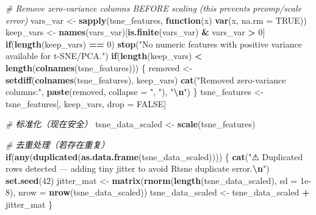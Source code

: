 \documentclass[
]{article}
\newenvironment{Shaded}{\begin{snugshade}}{\end{snugshade}}
\newcommand{\AttributeTok}[1]{\textcolor[rgb]{0.13,0.29,0.53}{#1}}
\newcommand{\CommentTok}[1]{\textcolor[rgb]{0.56,0.35,0.01}{\textit{#1}}}
\newcommand{\ConstantTok}[1]{\textcolor[rgb]{0.56,0.35,0.01}{#1}}
\newcommand{\ControlFlowTok}[1]{\textcolor[rgb]{0.13,0.29,0.53}{\textbf{#1}}}
\newcommand{\DecValTok}[1]{\textcolor[rgb]{0.00,0.00,0.81}{#1}}
\newcommand{\FloatTok}[1]{\textcolor[rgb]{0.00,0.00,0.81}{#1}}
\newcommand{\FunctionTok}[1]{\textcolor[rgb]{0.13,0.29,0.53}{\textbf{#1}}}
\newcommand{\NormalTok}[1]{#1}
\newcommand{\OtherTok}[1]{\textcolor[rgb]{0.56,0.35,0.01}{#1}}
\newcommand{\SpecialCharTok}[1]{\textcolor[rgb]{0.81,0.36,0.00}{\textbf{#1}}}
\newcommand{\StringTok}[1]{\textcolor[rgb]{0.31,0.60,0.02}{#1}}
\begin{document}
\begin{Shaded}
\begin{Highlighting}[]
\CommentTok{\# Remove zero{-}variance columns BEFORE scaling (this prevents prcomp/scale error)}
\NormalTok{vars\_var }\OtherTok{\textless{}{-}} \FunctionTok{sapply}\NormalTok{(tsne\_features, }\ControlFlowTok{function}\NormalTok{(x) }\FunctionTok{var}\NormalTok{(x, }\AttributeTok{na.rm =} \ConstantTok{TRUE}\NormalTok{))}
\NormalTok{keep\_vars }\OtherTok{\textless{}{-}} \FunctionTok{names}\NormalTok{(vars\_var)[}\FunctionTok{is.finite}\NormalTok{(vars\_var) }\SpecialCharTok{\&}\NormalTok{ vars\_var }\SpecialCharTok{\textgreater{}} \DecValTok{0}\NormalTok{]}
\ControlFlowTok{if}\NormalTok{(}\FunctionTok{length}\NormalTok{(keep\_vars) }\SpecialCharTok{==} \DecValTok{0}\NormalTok{) }\FunctionTok{stop}\NormalTok{(}\StringTok{"No numeric features with positive variance available for t{-}SNE/PCA."}\NormalTok{)}
\ControlFlowTok{if}\NormalTok{(}\FunctionTok{length}\NormalTok{(keep\_vars) }\SpecialCharTok{\textless{}} \FunctionTok{length}\NormalTok{(}\FunctionTok{colnames}\NormalTok{(tsne\_features))) \{}
\NormalTok{  removed }\OtherTok{\textless{}{-}} \FunctionTok{setdiff}\NormalTok{(}\FunctionTok{colnames}\NormalTok{(tsne\_features), keep\_vars)}
  \FunctionTok{cat}\NormalTok{(}\StringTok{"Removed zero{-}variance columns:"}\NormalTok{, }\FunctionTok{paste}\NormalTok{(removed, }\AttributeTok{collapse =} \StringTok{", "}\NormalTok{), }\StringTok{"}\SpecialCharTok{\textbackslash{}n}\StringTok{"}\NormalTok{)}
\NormalTok{\}}
\NormalTok{tsne\_features }\OtherTok{\textless{}{-}}\NormalTok{ tsne\_features[, keep\_vars, drop }\OtherTok{=} \ConstantTok{FALSE}\NormalTok{]}

\CommentTok{\# 标准化（现在安全）}
\NormalTok{tsne\_data\_scaled }\OtherTok{\textless{}{-}} \FunctionTok{scale}\NormalTok{(tsne\_features)}

\CommentTok{\# 去重处理（若存在重复）}
\ControlFlowTok{if}\NormalTok{(}\FunctionTok{any}\NormalTok{(}\FunctionTok{duplicated}\NormalTok{(}\FunctionTok{as.data.frame}\NormalTok{(tsne\_data\_scaled)))) \{}
  \FunctionTok{cat}\NormalTok{(}\StringTok{"⚠ Duplicated rows detected — adding tiny jitter to avoid Rtsne duplicate error.}\SpecialCharTok{\textbackslash{}n}\StringTok{"}\NormalTok{)}
  \FunctionTok{set.seed}\NormalTok{(}\DecValTok{42}\NormalTok{)}
\NormalTok{  jitter\_mat }\OtherTok{\textless{}{-}} \FunctionTok{matrix}\NormalTok{(}\FunctionTok{rnorm}\NormalTok{(}\FunctionTok{length}\NormalTok{(tsne\_data\_scaled), }\AttributeTok{sd =} \FloatTok{1e{-}8}\NormalTok{), }\AttributeTok{nrow =} \FunctionTok{nrow}\NormalTok{(tsne\_data\_scaled))}
\NormalTok{  tsne\_data\_scaled }\OtherTok{\textless{}{-}}\NormalTok{ tsne\_data\_scaled }\SpecialCharTok{+}\NormalTok{ jitter\_mat}
\NormalTok{\}}


\end{Highlighting}
\end{Shaded}
\end{document}

